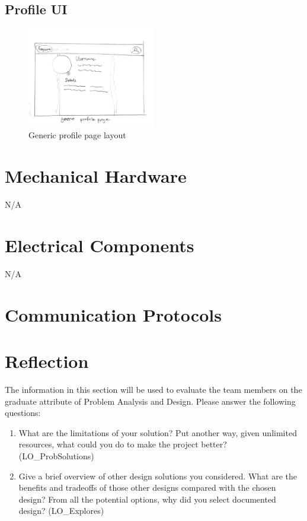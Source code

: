 \documentclass[12pt, titlepage]{article}
\begin{document}
\subsection{Profile UI}
\begin{figure}[H]
    \centering
    \includegraphics[width=0.5\textwidth]{Design/SystDesign/homepages/ui_genericPro.png}
    \caption{Generic profile page layout}
    \label{fig:gnericProfile}
\end{figure}

\section{Mechanical Hardware}

N/A

\section{Electrical Components}

N/A

\section{Communication Protocols}

\section{Reflection}

The information in this section will be used to evaluate the team members on the
graduate attribute of Problem Analysis and Design.  Please answer the following questions:

\begin{enumerate}
  \item What are the limitations of your solution?  Put another way, given
  unlimited resources, what could you do to make the project better? (LO\_ProbSolutions)
  \item Give a brief overview of other design solutions you considered.  What
  are the benefits and tradeoffs of those other designs compared with the chosen
  design?  From all the potential options, why did you select documented design?
  (LO\_Explores)
\end{enumerate}
\end{document}
